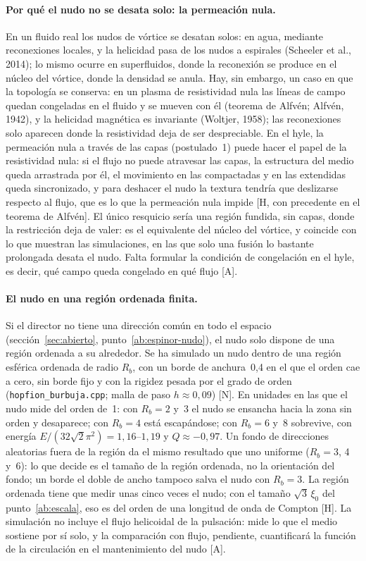 \documentclass[11pt,a4paper]{article}
\newcommand{\st}[1]{\textup{[#1]}}
\newcommand{\prog}[1]{\texttt{#1}}
\newcommand{\apartado}[1]{\paragraph{#1}}
\begin{document}
\apartado{Por qué el nudo no se desata solo: la permeación nula.} En un fluido real los nudos de vórtice se desatan solos: en agua, mediante reconexiones locales, y la helicidad pasa de los nudos a espirales (Scheeler et al., 2014); lo mismo ocurre en superfluidos, donde la reconexión se produce en el núcleo del vórtice, donde la densidad se anula. Hay, sin embargo, un caso en que la topología se conserva: en un plasma de resistividad nula las líneas de campo quedan congeladas en el fluido y se mueven con él (teorema de Alfvén; Alfvén, 1942), y la helicidad magnética es invariante (Woltjer, 1958); las reconexiones solo aparecen donde la resistividad deja de ser despreciable. En el hyle, la permeación nula a través de las capas (postulado~1) puede hacer el papel de la resistividad nula: si el flujo no puede atravesar las capas, la estructura del medio queda arrastrada por él, el movimiento en las compactadas y en las extendidas queda sincronizado, y para deshacer el nudo la textura tendría que deslizarse respecto al flujo, que es lo que la permeación nula impide \st{H, con precedente en el teorema de Alfvén}. El único resquicio sería una región fundida, sin capas, donde la restricción deja de valer: es el equivalente del núcleo del vórtice, y coincide con lo que muestran las simulaciones, en las que solo una fusión lo bastante prolongada desata el nudo. Falta formular la condición de congelación en el hyle, es decir, qué campo queda congelado en qué flujo \st{A}.

\apartado{El nudo en una región ordenada finita.} Si el director no tiene una dirección común en todo el espacio (sección~\ref{sec:abierto}, punto~\ref{ab:espinor-nudo}), el nudo solo dispone de una región ordenada a su alrededor. Se ha simulado un nudo dentro de una región esférica ordenada de radio $R_b$, con un borde de anchura~0,4 en el que el orden cae a cero, sin borde fijo y con la rigidez pesada por el grado de orden (\prog{hopfion\_burbuja.cpp}; malla de paso $h\approx0,09$) \st{N}. En unidades en las que el nudo mide del orden de~1: con $R_b=2$ y~3 el nudo se ensancha hacia la zona sin orden y desaparece; con $R_b=4$ está escapándose; con $R_b=6$ y~8 sobrevive, con energía $E/(32\sqrt2\pi^2)=1,16$--$1,19$ y $Q\approx-0,97$. Un fondo de direcciones aleatorias fuera de la región da el mismo resultado que uno uniforme ($R_b=3$, 4 y~6): lo que decide es el tamaño de la región ordenada, no la orientación del fondo; un borde el doble de ancho tampoco salva el nudo con $R_b=3$. La región ordenada tiene que medir unas cinco veces el nudo; con el tamaño $\sqrt3\,\xi_0$ del punto~\ref{ab:escala}, eso es del orden de una longitud de onda de Compton \st{H}. La simulación no incluye el flujo helicoidal de la pulsación: mide lo que el medio sostiene por sí solo, y la comparación con flujo, pendiente, cuantificará la función de la circulación en el mantenimiento del nudo \st{A}.
\end{document}
